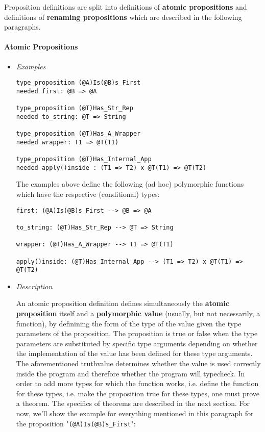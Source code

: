 \documentclass{article}
\begin{document}
Proposition definitions are split into definitions of \textbf{atomic
propositions} and definitions of \textbf{renaming propositions} which are
described in the following paragraphs.

\paragraph{Atomic Propositions}

\begin{itemize}
\item \textit{Examples}
\begin{verbatim}
type_proposition (@A)Is(@B)s_First
needed first: @B => @A

type_proposition (@T)Has_Str_Rep
needed to_string: @T => String

type_proposition (@T)Has_A_Wrapper
needed wrapper: T1 => @T(T1)

type_proposition (@T)Has_Internal_App
needed apply()inside : (T1 => T2) x @T(T1) => @T(T2)
\end{verbatim}
The examples above define the following (ad hoc) polymorphic functions which
have the respective (conditional) types:
\begin{verbatim}
first: (@A)Is(@B)s_First --> @B => @A

to_string: (@T)Has_Str_Rep --> @T => String

wrapper: (@T)Has_A_Wrapper --> T1 => @T(T1)

apply()inside: (@T)Has_Internal_App --> (T1 => T2) x @T(T1) => @T(T2)
\end{verbatim}

\newpage

\item \textit{Description}

An atomic proposition definition defines simultaneously the \textbf{atomic
proposition} itself and a \textbf{polymorphic value} (usually, but not
necessarily, a function), by definining the form of the type of the value given
the type parameters of the proposition. The proposition is true or false when
the type parameters are substituted by specific type arguments depending on
whether the implementation of the value has been defined for these type
arguments. The aforementioned truthvalue determines whether the value is used
correctly inside the program and therefore whether the program will typecheck.
In order to add more types for which the function works, i.e.  define the
function for these types, i.e. make the proposition true for these types, one
must prove a theorem. The specifics of theorems are described in the next
section. For now, we'll show the example for everything mentioned in this
paragraph for the proposition "\verb|(@A)Is(@B)s_First|":


\end{itemize}
\end{document}
